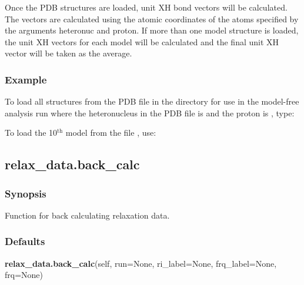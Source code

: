  Once the PDB structures are loaded, unit XH bond vectors will be calculated.  The vectors are calculated using the atomic coordinates of the atoms specified by the arguments heteronuc and proton.  If more than one model structure is loaded, the unit XH vectors for each model will be calculated and the final unit XH vector will be taken as the average. 
  

  
 \subsubsection{Example} 

 To load all structures from the PDB file  in the directory  for use in the model-free analysis run  where the heteronucleus in the PDB file is  and the proton is , type: 
  



 To load the 10$^\mathrm{th}$ model from the file , use: 
  



  

 \newpage 

 \subsection{relax\_data.back\_calc} 

  
 \subsubsection{Synopsis} 

 Function for back calculating relaxation data. 
  

  
 \subsubsection{Defaults} 

 \textsf{\textbf{relax\_data.back\_calc}(self, run=None, ri\_label=None, frq\_label=None, frq=None)} 

